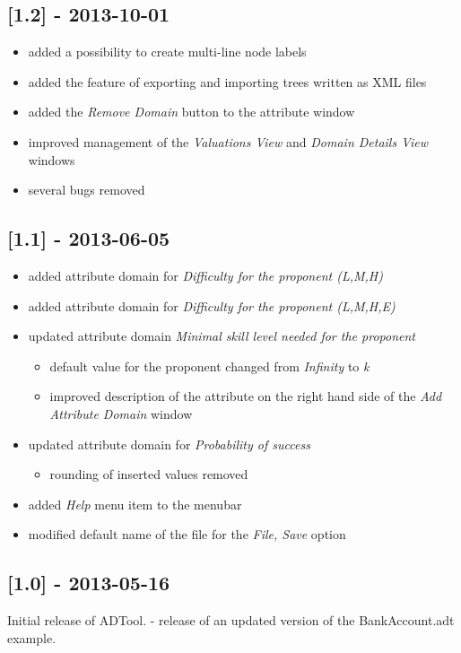 \subsection{{[}1.2{]} - 2013-10-01}\label{section-9}

\begin{itemize}
\tightlist
\item
  added a possibility to create multi-line node labels
\item
  added the feature of exporting and importing trees written as XML
  files
\item
  added the \emph{Remove Domain} button to the attribute window
\item
  improved management of the \emph{Valuations View} and \emph{Domain
  Details View} windows
\item
  several bugs removed
\end{itemize}

\subsection{{[}1.1{]} - 2013-06-05}\label{section-10}

\begin{itemize}
\tightlist
\item
  added attribute domain for \emph{Difficulty for the proponent (L,M,H)}
\item
  added attribute domain for \emph{Difficulty for the proponent
  (L,M,H,E)}
\item
  updated attribute domain \emph{Minimal skill level needed for the
  proponent}

  \begin{itemize}
  \tightlist
  \item
    default value for the proponent changed from \emph{Infinity} to
    \emph{k}
  \item
    improved description of the attribute on the right hand side of the
    \emph{Add Attribute Domain} window
  \end{itemize}
\item
  updated attribute domain for \emph{Probability of success}

  \begin{itemize}
  \tightlist
  \item
    rounding of inserted values removed
  \end{itemize}
\item
  added \emph{Help} menu item to the menubar
\item
  modified default name of the file for the \emph{File, Save} option
\end{itemize}

\subsection{{[}1.0{]} - 2013-05-16}\label{section-11}

Initial release of ADTool. - release of an updated version of the
BankAccount.adt example.
